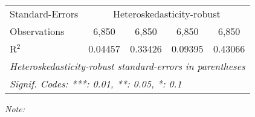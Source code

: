 \begin{table}[htbp!]
\begin{adjustbox}{width = 1\textwidth, max height = 0.95\textheight, center}
\begin{threeparttable}[b]
\begin{tabular}{lcccc}
            \midrule 
            Standard-Errors & \multicolumn{4}{c}{Heteroskedasticity-robust} \\ 
            Observations         & 6,850                          & 6,850                          & 6,850                          & 6,850\\  
            R$^2$                & 0.04457                        & 0.33426                        & 0.09395                        & 0.43066\\  
            \midrule \midrule
            \multicolumn{5}{l}{\emph{Heteroskedasticity-robust standard-errors in parentheses}}\\
            \multicolumn{5}{l}{\emph{Signif. Codes: ***: 0.01, **: 0.05, *: 0.1}}\\
         \end{tabular}
         
         \begin{tablenotes}\item \medskip \textit{Note:}
         \end{tablenotes}
      \end{threeparttable}
   \end{adjustbox}
\end{table}


